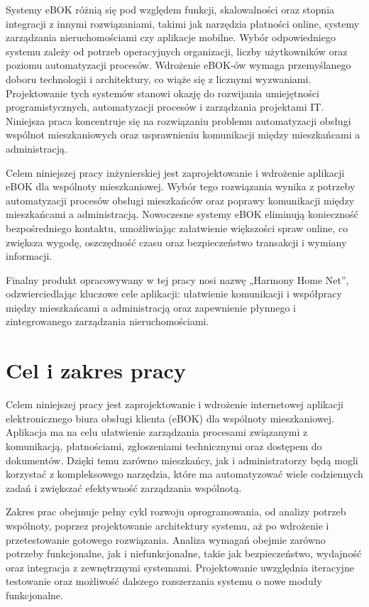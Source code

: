 Systemy eBOK różnią się pod względem funkcji, skalowalności oraz stopnia integracji z innymi rozwiązaniami, takimi jak narzędzia płatności online, systemy zarządzania nieruchomościami czy aplikacje mobilne. Wybór odpowiedniego systemu zależy od potrzeb operacyjnych organizacji, liczby użytkowników oraz poziomu automatyzacji procesów. Wdrożenie eBOK-ów wymaga przemyślanego doboru technologii i architektury, co wiąże się z licznymi wyzwaniami. Projektowanie tych systemów stanowi okazję do rozwijania umiejętności programistycznych, automatyzacji procesów i zarządzania projektami IT. Niniejsza praca koncentruje się na rozwiązaniu problemu automatyzacji obsługi wspólnot mieszkaniowych oraz usprawnieniu komunikacji między mieszkańcami a administracją.

Celem niniejszej pracy inżynierskiej jest zaprojektowanie i wdrożenie aplikacji eBOK dla wspólnoty mieszkaniowej. Wybór tego rozwiązania wynika z potrzeby automatyzacji procesów obsługi mieszkańców oraz poprawy komunikacji między mieszkańcami a administracją. Nowoczesne systemy eBOK eliminują konieczność bezpośredniego kontaktu, umożliwiając załatwienie większości spraw online, co zwiększa wygodę, oszczędność czasu oraz bezpieczeństwo transakcji i wymiany informacji.

Finalny produkt opracowywany w tej pracy nosi nazwę „Harmony Home Net”, odzwierciedlając kluczowe cele aplikacji: ułatwienie komunikacji i współpracy między mieszkańcami a administracją oraz zapewnienie płynnego i zintegrowanego zarządzania nieruchomościami.

\section{Cel i zakres pracy}

Celem niniejszej pracy jest zaprojektowanie i wdrożenie internetowej aplikacji elektronicznego biura obsługi klienta (eBOK) dla wspólnoty mieszkaniowej. Aplikacja ma na celu ułatwienie zarządzania procesami związanymi z komunikacją, płatnościami, zgłoszeniami technicznymi oraz dostępem do dokumentów. Dzięki temu zarówno mieszkańcy, jak i administratorzy będą mogli korzystać z kompleksowego narzędzia, które ma automatyzować wiele codziennych zadań i zwiększać efektywność zarządzania wspólnotą.

Zakres prac obejmuje pełny cykl rozwoju oprogramowania, od analizy potrzeb wspólnoty, poprzez projektowanie architektury systemu, aż po wdrożenie i przetestowanie gotowego rozwiązania. Analiza wymagań obejmie zarówno potrzeby funkcjonalne, jak i niefunkcjonalne, takie jak bezpieczeństwo, wydajność oraz integracja z zewnętrznymi systemami. Projektowanie uwzględnia iteracyjne testowanie oraz możliwość dalszego rozszerzania systemu o nowe moduły funkcjonalne.

